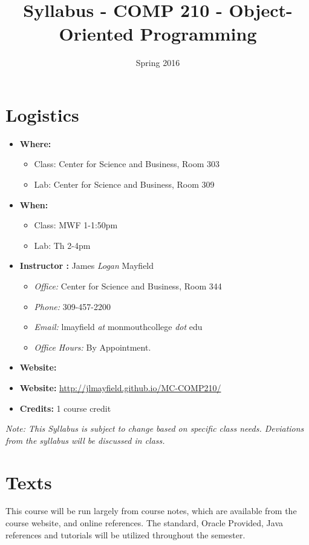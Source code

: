 \documentclass[10pt]{article}
\title{Syllabus - COMP 210 - Object-Oriented Programming}
\author{ }
\date{Spring 2016}
\begin{document}
\maketitle

\section{Logistics}
\begin{itemize}
\item \textbf{Where: } 
\begin{itemize}
\item Class: Center for Science and Business, Room 303
\item Lab: Center for Science and Business, Room 309
\end{itemize}
\item \textbf{When: } 
\begin{itemize}
\item Class: MWF 1-1:50pm
\item Lab: Th 2-4pm
\end{itemize}
\item \textbf{Instructor :} James \textit{Logan} Mayfield
\begin{itemize}
\item \textit{Office: } Center for Science and Business, Room 344
\item \textit{Phone: } 309-457-2200
\item \textit{Email: } lmayfield \textit{at} monmouthcollege \textit{dot} edu
\item \textit{Office Hours: } By Appointment.
\end{itemize}
\item \textbf{Website: } \item \textbf{Website: } \url{http://jlmayfield.github.io/MC-COMP210/}
\item \textbf{Credits: } 1 course credit
\end{itemize}
\emph{Note: This Syllabus is subject to change based on specific class needs. Deviations from the syllabus will be discussed in class.}


\section{Texts}

This course will be run largely from course notes, which are available from the course website, and online references. The standard, Oracle Provided, Java references and tutorials will be utilized throughout the semester.
\vspace{.25in}
\end{document}
